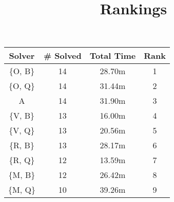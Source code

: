 \documentclass{article}
\title{Rankings}
\begin{document}
\maketitle

\begin{table}[ht!]
\centering

\begin{tabular}{|c||c|c||c|}\hline
Solver   & \# Solved & Total Time & Rank \\\hline\hline
\{O, B\} & 14        & 28.70m     & 1\\\hline
\{O, Q\} & 14        & 31.44m     & 2\\\hline
A        & 14        & 31.90m     & 3\\\hline
\{V, B\} & 13        & 16.00m     & 4\\\hline
\{V, Q\} & 13        & 20.56m     & 5\\\hline
\{R, B\} & 13        & 28.17m     & 6\\\hline
\{R, Q\} & 12        & 13.59m     & 7\\\hline
\{M, B\} & 12        & 26.42m     & 8\\\hline
\{M, Q\} & 10        & 39.26m     & 9\\\hline
\end{tabular}
\end{table}
\end{document}
